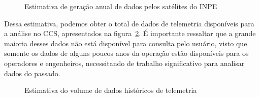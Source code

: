 \begin{figure}[!htb]
	\caption{Estimativa de geração anual de dados pelos satélites do INPE}\label{fig:datagenest}
	\vspace{4mm}
	\begin{center}
	\end{center}
	\vspace{2mm}
	\legenda{}
\end{figure}

Dessa estimativa, podemos obter o total de dados de telemetria disponíveis para a análise no CCS, apresentados na figura~\ref{fig:totaldatagen}.
É importante ressaltar que a grande maioria desses dados não está disponível para consulta pelo usuário, visto que somente os dados de alguns poucos anos da operação estão disponíveis para os operadores e engenheiros, necessitando de trabalho significativo para analisar dados do passado.

\begin{figure}[!htb]
	\caption{Estimativa do volume de dados históricos de telemetria}\label{fig:totaldatagen}
	\vspace{4mm}
	\begin{center}
	\end{center}
	\vspace{2mm}
	\legenda{}
\end{figure}

